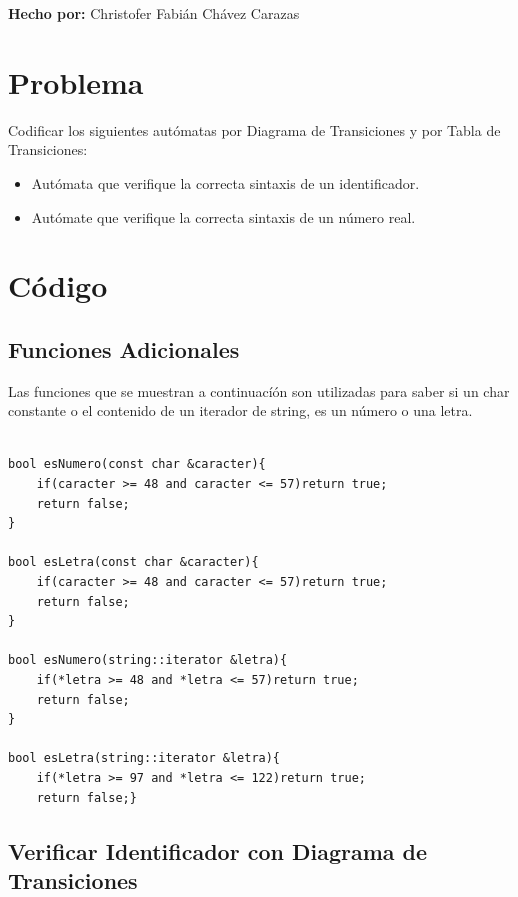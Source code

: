 \documentclass[a4paper,12pt]{article}
\begin{document}
\begin{Large}
\textbf{Hecho por:} Christofer Fabián Chávez Carazas
\end{Large}

\section{Problema}

Codificar los siguientes autómatas por Diagrama de Transiciones y por Tabla de Transiciones:

\begin{itemize}

\item Autómata que verifique la correcta sintaxis de un identificador.
\item Autómate que verifique la correcta sintaxis de un número real.

\end{itemize}

\section{Código} 

\subsection{Funciones Adicionales}

Las funciones que se muestran a continuacíón son utilizadas para saber si un char constante o el contenido de un iterador de string, es un número o una letra.

\begin{lstlisting}

bool esNumero(const char &caracter){
    if(caracter >= 48 and caracter <= 57)return true;
    return false;
}

bool esLetra(const char &caracter){
    if(caracter >= 48 and caracter <= 57)return true;
    return false;
}

bool esNumero(string::iterator &letra){
    if(*letra >= 48 and *letra <= 57)return true;
    return false;
}

bool esLetra(string::iterator &letra){
    if(*letra >= 97 and *letra <= 122)return true;
    return false;}

\end{lstlisting}

\subsection{Verificar Identificador con Diagrama de Transiciones}
\end{document}
